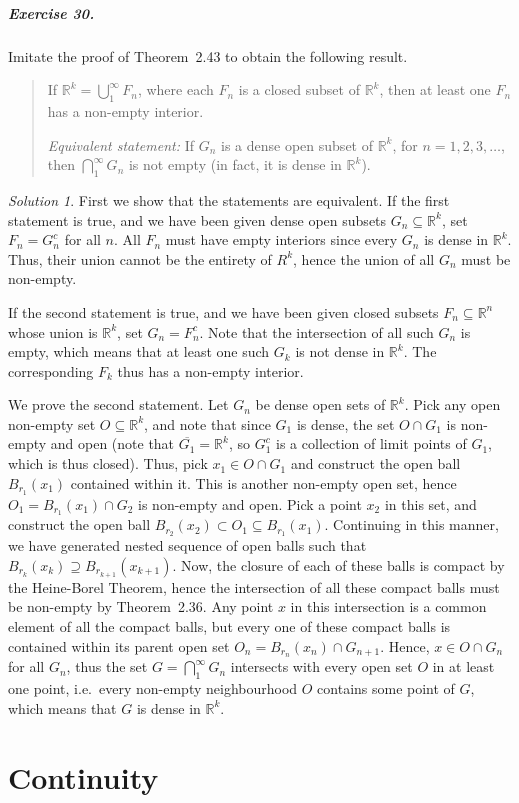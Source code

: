 \documentclass[11pt]{report}
\def\R{\mathbb{R}}
\theoremstyle{remark}
\newtheorem*{solution}{Solution}
\begin{document}
    \paragraph{Exercise 30.} Imitate the proof of Theorem~2.43 to obtain the
    following result.
    \begin{quote}
        If $\R^{k} = \bigcup_1^\infty F_n$, where each $F_n$ is a closed subset of
        $\R^k$, then at least one $F_n$ has a non-empty interior.

        \textit{Equivalent statement:} If $G_n$ is a dense open subset of $\R^k$,
        for $n = 1, 2, 3, \dots$, then $\bigcap_1^\infty G_n$ is not empty (in fact,
        it is dense in $\R^k$).
    \end{quote}
    \begin{solution}
        First we show that the statements are equivalent. If the first statement is
        true, and we have been given dense open subsets $G_n \subseteq \R^k$, set
        $F_n = G_n^c$ for all $n$. All $F_n$ must have empty interiors since every
        $G_n$ is dense in $\R^k$. Thus, their union cannot be the entirety of $R^k$,
        hence the union of all $G_n$ must be non-empty.

        If the second statement is true, and we have been given closed subsets $F_n
        \subseteq \R^n$ whose union is $\R^k$, set $G_n = F_n^c$. Note that the
        intersection of all such $G_n$ is empty, which means that at least one such
        $G_k$ is not dense in $\R^k$. The corresponding $F_k$ thus has a non-empty
        interior.

        We prove the second statement. Let $G_n$ be dense open sets of $\R^k$. Pick
        any open non-empty set $O \subseteq \R^k$, and note that since $G_1$ is
        dense, the set $O \cap G_1$ is non-empty and open (note that $\overline{G_1}
        = \R^k$, so $G_1^c$ is a collection of limit points of $G_1$, which is thus
        closed). Thus, pick $x_1 \in O \cap G_1$ and construct the open ball
        $B_{r_1}(x_1)$ contained within it. This is another non-empty open set,
        hence $O_1 = B_{r_1}(x_1) \cap G_2$ is non-empty and open. Pick a point
        $x_2$ in this set, and construct the open ball $B_{r_2}(x_2) \subset O_1
        \subseteq B_{r_1}(x_1)$. Continuing in this manner, we have generated nested
        sequence of open balls such that $B_{r_k}(x_k) \supseteq B_{r_{k + 1}}(x_{k
        + 1})$.  Now, the closure of each of these balls is compact by the
        Heine-Borel Theorem, hence the intersection of all these compact balls must
        be non-empty by Theorem~2.36. Any point $x$ in this intersection is a common
        element of all the compact balls, but every one of these compact balls is
        contained within its parent open set $O_n = B_{r_n}(x_n) \cap G_{n + 1}$.
        Hence, $x \in O \cap G_n$ for all $G_n$, thus the set $G = \bigcap_1^\infty
        G_n$ intersects with every open set $O$ in at least one point, i.e.\ every
        non-empty neighbourhood $O$ contains some point of $G$, which means that $G$
        is dense in $\R^k$.
    \end{solution}
    

    \setcounter{chapter}{3}
    \chapter{Continuity}

    
    
\end{document}
